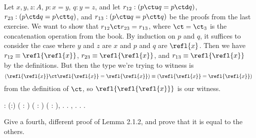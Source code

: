  \soln
Let $x, y, z : A$, $p : x = y$, $q : y = z$, and let $r_{12} : (p \ctu q = p
\ctd q)$, $r_{23} : (p \ctd q = p \ctt q)$, and $r_{13} : (p \ctu q = p
\ctt q)$ be the proofs from the last exercise.  We want to show that $r_{12}
\ct r_{23} = r_{13}$, where $\ct = \ct_{3}$ is the concatenation operation from
the book.  By induction on $p$ and $q$, it suffices to consider the case where
$y$ and $z$ are $x$ and $p$ and $q$ are $\refl{x}$.  Then we have $r_{12}
\equiv \refl{\refl{x}}$, $r_{23} \equiv \refl{\refl{x}}$, and
$r_{13} \equiv \refl{\refl{x}}$ by the definitions.  But then the type we're
trying to witness is
\[
    (\refl{\refl{x}} \ct \refl{\refl{x}} = \refl{\refl{x}})
    \equiv
    (\refl{\refl{x}} = \refl{\refl{x}})
\]
from the definition of $\ct$, so $\refl{\refl{\refl{x}}}$ is our witness.
\begin{coqdoccode}
\coqdocemptyline
\coqdocnoindent
{}  : \coqdockw{\ensuremath{\forall}} (:) (   : ) ( :  \coqdocnotation{=} ) ( :  \coqdocnotation{=} ),\coqdoceol
\coqdocindent{1.00em}
\coqdocnotation{(}  \coqdocnotation{)}  \coqdocnotation{(}  \coqdocnotation{)} \coqdocnotation{=} \coqdocnotation{(}  \coqdocnotation{)}.\coqdoceol
\coqdocnoindent
{}.\coqdoceol
\coqdocindent{1.00em}
 , . .\coqdoceol
\coqdocnoindent
{}.\coqdoceol
\coqdocemptyline
\end{coqdoccode}
Give a fourth, different proof of Lemma 2.1.2, and prove that it is equal to
the others.


